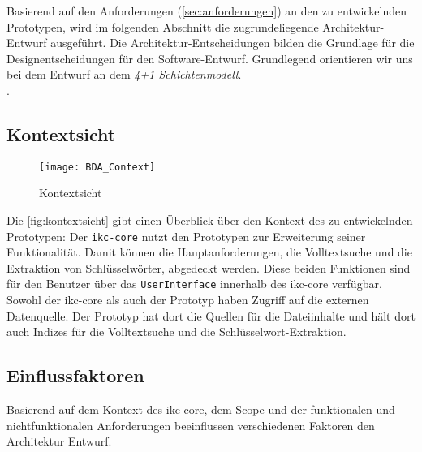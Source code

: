 
Basierend auf den Anforderungen (\autoref{sec:anforderungen}) an den zu entwickelnden Prototypen, wird im folgenden Abschnitt die zugrundeliegende Architektur-Entwurf ausgeführt. Die Ar\-chi\-tek\-tur-\-Ent\-schei\-dung\-en bilden die Grundlage für die Designentscheidungen für den Soft\-wa\-re-\-Ent\-wurf. Grundlegend orientieren wir uns bei dem Entwurf an dem \textit{4+1 Schichtenmodell}. \\\cite{kruchten1995architectural}.




\subsection{Kontextsicht}
    \begin{figure}[ht]
    \centering
    \texttt{[image: BDA\_Context]}
    \caption{Kontextsicht}
    \label{fig:kontextsicht}
    \end{figure}
 
 Die \autoref{fig:kontextsicht} gibt einen Überblick über den Kontext des zu entwickelnden Prototypen:
 Der \texttt{ikc-core} nutzt den Prototypen zur Erweiterung seiner Funktionalität. Damit können die Hauptanforderungen, die Volltextsuche und die Extraktion von Schlüsselwörter, abgedeckt werden. Diese beiden Funktionen sind für den Benutzer über das \texttt{UserInterface} innerhalb des \gls{ikc-core} verfügbar. Sowohl der \gls{ikc-core} als auch der Prototyp haben Zugriff auf die externen Datenquelle. Der Prototyp hat dort die Quellen für die Dateiinhalte und hält dort auch Indizes für die Volltextsuche und die Schlü\-ssel\-wort-Ex\-trak\-tion.
 



\subsection{Einflussfaktoren}\label{einflussfaktoren}

Basierend auf dem Kontext des \gls{ikc-core}, dem Scope und der funktionalen und nichtfunktionalen Anforderungen beeinflussen verschiedenen Faktoren den Architektur Entwurf.

